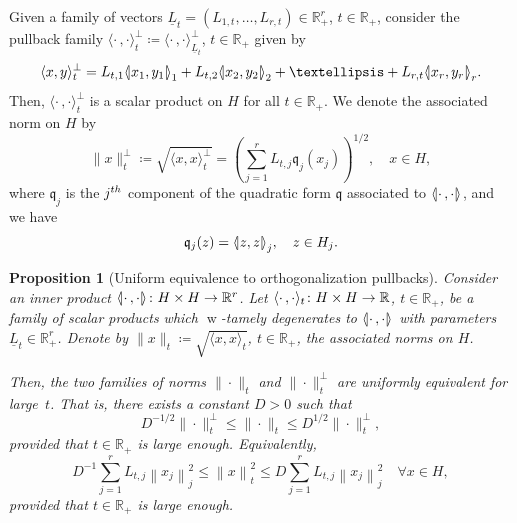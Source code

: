 \documentclass[10pt,a4paper]{amsart}
\newcommand{\innone}[2]{{\langle#2\rangle_{#1}}}
\newcommand{\llangle}{\mathopen{\langle\mkern -3.1mu\lvert}}
\newcommand{\rrangle}{\mathclose{\rvert\mkern -3.1mu\rangle}}
\newcommand{\highinn}[2]{{\llangle#2\rrangle_{#1}}}
\newcommand{\innoneorth}[2]{{\langle#2\rangle^{\perp}_{#1}}}
\newcommand{\norm}[1]{\|#1\|}
\newcommand{\normbsq}[1]{\left\|#1\right\|^{2}}
\newcommand{\normorth}[1]{\|#1\|^{\perp}}
\DeclareMathOperator{\weak}{w}
\newcommand{\R}{\mathbb{R}}
\newcommand{\qf}{\mathfrak{q}}
\renewcommand*{\to}{\mathchoice{\longrightarrow}{\rightarrow}{\rightarrow}{\rightarrow}}
\let\oldforall\forall
\renewcommand*{\forall}{\mathrel{\oldforall}}
\newtheorem{prop}[cdrthm]{Proposition}
\theoremstyle{definition}\newtheorem{defi}[cdrthm]{Definition}
\begin{document}
Given a family of vectors $\underline L_t =(L_{1,t}, \dots, L_{r,t}) \in \R_+^r$, $t \in \R_+$, consider the pullback family $\innoneorth{t}{\cdot\,,\cdot} \coloneqq \innoneorth{\underline L_t}{\cdot\,,\cdot}$, $t \in \R_+$ given by
\[
\innoneorth{t}{x,y} = L_{t,1}\highinn{1}{x_1, y_1} + L_{t,2}\highinn{2}{x_2, y_2}+ \dots+L_{r,t}\highinn{r}{x_r, y_r}.
\]
Then, $\innoneorth{t}{\cdot\,, \cdot}$ is a scalar product on $H$ for all $t \in \R_+$. We denote the associated norm on $H$ by
\[
\normorth{x}_t \coloneqq \sqrt{\innoneorth{t}{x, x}} = \left(\sum_{j=1}^r L_{t,j} \qf_j(x_j) \right)^{1/2}, \quad x \in H,
\]
where $\qf_j$ is the $j^{\rm th}$ component of the quadratic form $\qf$ associated to $\highinn{}{\cdot\,,\cdot}$, and we have
\[
\qf_j(z) = \highinn{j}{z, z}, \quad z \in H_j.
\]
\begin{prop}[Uniform equivalence to orthogonalization pullbacks] \label{prop:apriori_estimate}
Consider an inner product $\highinn{}{\cdot\,, \cdot} \colon H \times H \to \R^r$. Let $\innone{t}{\cdot \,, \cdot} \colon H \times H \to \R$, $t \in \R_+$, be a family of scalar products which $\weak$-tamely degenerates to $\highinn{}{\cdot\,, \cdot}$ with parameters $\underline L_t \in \R_+^r$. Denote by $\norm{x}_t \coloneqq \sqrt{\innone{t}{x,x}}$, $t \in \R_+$, the associated norms on $H$.

Then, the two families of norms $\norm{\cdot}_t $ and $\normorth{\cdot}_t$ are uniformly equivalent for large~$t$. That is, there exists a constant $D >0$ such that
\[
D^{-1/2} \normorth{\cdot}_t \le \norm{\cdot}_t \le D^{1/2} \normorth{\cdot}_t,
\]
provided that $t \in \R_+$ is large enough. Equivalently,
\begin{equation}\label{eq:apriori_estimate}
D^{-1} \sum_{j=1}^r L_{t,j} \left\|x_j\right\|^2_j \le \normbsq{x}_t \le D \sum_{j=1}^r L_{t,j} \normbsq{x_j}_j \quad \forall x\in H,
\end{equation}
provided that $t \in \R_+$ is large enough.
\end{prop}
\end{document}
